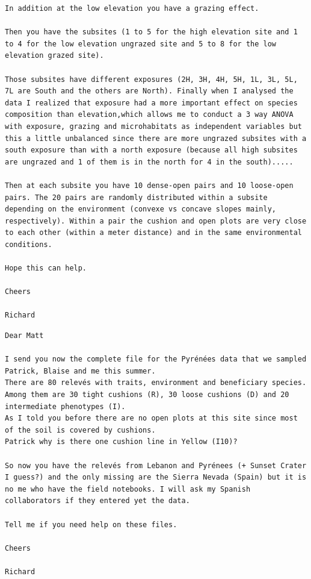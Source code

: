 \documentclass[12pt]{article}
\begin{document}
\begin{verbatim}
In addition at the low elevation you have a grazing effect.

Then you have the subsites (1 to 5 for the high elevation site and 1
to 4 for the low elevation ungrazed site and 5 to 8 for the low
elevation grazed site).

Those subsites have different exposures (2H, 3H, 4H, 5H, 1L, 3L, 5L,
7L are South and the others are North). Finally when I analysed the
data I realized that exposure had a more important effect on species
composition than elevation,which allows me to conduct a 3 way ANOVA
with exposure, grazing and microhabitats as independent variables but
this a little unbalanced since there are more ungrazed subsites with a
south exposure than with a north exposure (because all high subsites
are ungrazed and 1 of them is in the north for 4 in the south).....

Then at each subsite you have 10 dense-open pairs and 10 loose-open
pairs. The 20 pairs are randomly distributed within a subsite
depending on the environment (convexe vs concave slopes mainly,
respectively). Within a pair the cushion and open plots are very close
to each other (within a meter distance) and in the same environmental
conditions.

Hope this can help.

Cheers

Richard
\end{verbatim}

\begin{verbatim}
Dear Matt

I send you now the complete file for the Pyrénées data that we sampled
Patrick, Blaise and me this summer.
There are 80 relevés with traits, environment and beneficiary species.
Among them are 30 tight cushions (R), 30 loose cushions (D) and 20
intermediate phenotypes (I).
As I told you before there are no open plots at this site since most
of the soil is covered by cushions.
Patrick why is there one cushion line in Yellow (I10)?

So now you have the relevés from Lebanon and Pyrénees (+ Sunset Crater
I guess?) and the only missing are the Sierra Nevada (Spain) but it is
no me who have the field notebooks. I will ask my Spanish
collaborators if they entered yet the data.

Tell me if you need help on these files.

Cheers

Richard
\end{verbatim}
\end{document}
